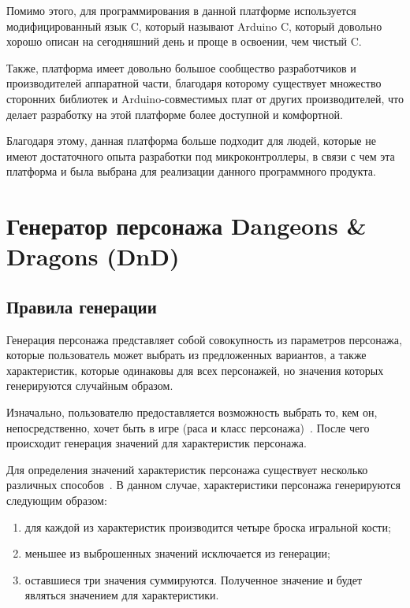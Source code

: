 \documentclass{altsu-report}
\begin{document}
Помимо этого, для программирования в данной платформе используется модифицированный язык C, который называют Arduino C, который довольно хорошо описан на сегодняшний день и проще в освоении, чем чистый C.

Также, платформа имеет довольно большое сообщество разработчиков и производителей аппаратной части, благодаря которому существует множество сторонних библиотек и Arduino-совместимых плат от других производителей, что делает разработку на этой платформе более доступной и комфортной.

Благодаря этому, данная платформа больше подходит для людей, которые не имеют достаточного опыта разработки под микроконтроллеры, в связи с чем эта платформа и была выбрана для реализации данного программного продукта.

\chapter{Генератор персонажа Dangeons \& Dragons (DnD)}
\section{Правила генерации}

Генерация персонажа представляет собой совокупность из параметров персонажа, которые пользователь может выбрать из предложенных вариантов, а также характеристик, которые одинаковы для всех персонажей, но значения которых генерируются случайным образом.

Изначально, пользователю предоставляется возможность выбрать то, кем он, непосредственно, хочет быть в игре (раса и класс персонажа)~\cite{D&D}. После чего происходит генерация значений для характеристик персонажа.

Для определения значений характеристик персонажа существует несколько различных способов~\cite{DnD, DnDWiki}. В данном случае, характеристики персонажа генерируются следующим образом:
\begin{enumerate}
    \item для каждой из характеристик производится четыре броска игральной кости;
    
    \item меньшее из выброшенных значений исключается из генерации;
    
    \item оставшиеся три значения суммируются. Полученное значение и будет являться значением для характеристики.
\end{enumerate}
\end{document}
